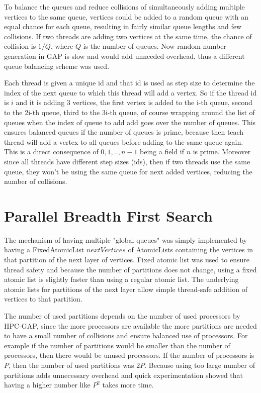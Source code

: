 \documentclass{report}
\theoremstyle{plain}
\theoremstyle{definition}
\theoremstyle{remark}
\begin{document}
To balance the queues and reduce collisions of simultaneously adding multiple vertices to the same queue, vertices could be added to a random queue with an equal chance for each queue, resulting in fairly similar queue lengths and few collisions. If two threads are adding two vertices at the same time, the chance of collision is $1/Q$, where $Q$ is the number of queues. Now random number generation in GAP is slow and would add unneeded overhead, thus a different queue balancing scheme was used.

Each thread is given a unique id and that id is used as step size to determine the index of the next queue to which this thread will add a vertex. So if the thread id is $i$ and it is adding 3 vertices, the first vertex is added to the i-th queue, second to the 2i-th queue, third to the 3i-th queue, of course wrapping around the list of queues when the index of queue to add add goes over the number of queues. This ensures balanced queues if the number of queues is prime, because then teach thread will add a vertex to all queues before adding to the same queue again. This is a direct consequence of ${0, 1,..,n-1}$ being a field if $n$ is prime. Moreover since all threads have different step sizes (ids), then if two threads use the same queue, they won't be using the same queue for next added vertices, reducing the number of collisions.

\section{Parallel Breadth First Search}

The mechanism of having multiple "global queues" was simply implemented by having a FixedAtomicList $nextVertices$ of AtomicLists containing the vertices in that partition of the next layer of vertices. Fixed atomic list was used to ensure thread safety and because the number of partitions does not change, using a fixed atomic list is slightly faster than using a regular atomic list. The underlying atomic lists for partitions of the next layer allow simple thread-safe addition of vertices to that partition.

The number of used partitions depends on the number of used processors by HPC-GAP, since the more processors are available the more partitions are needed to have a small number of collisions and ensure balanced use of processors. For example if the number of partitions would be smaller than the number of processors, then there would be unused processors. If the number of processors is $P$, then the number of used partitions was $2P$. Because using too large number of partitions adds unnecessary overhead and quick experimentation showed that having a higher number like $P^2$ takes more time.
\end{document}
